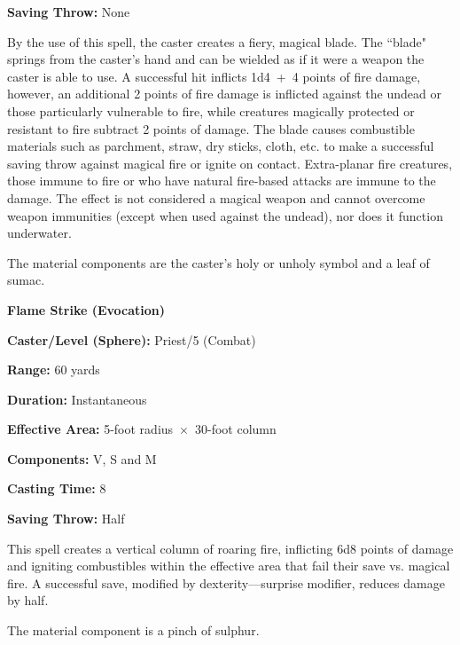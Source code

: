 \begin{multicols}{2}
\begin{minipage}{\columnwidth}
\noindent \textbf{Saving Throw:} None

\end{minipage}

By the use of this spell, the caster creates a fiery, magical blade.  The ``blade" springs from the caster's hand and can be wielded as if it were a weapon the caster is able to use.  A successful hit inflicts 1d4~+~4 points of fire damage, however, an additional 2 points of fire damage is inflicted against the undead or those particularly vulnerable to fire, while creatures magically protected or resistant to fire subtract 2 points of damage.  The blade causes combustible materials such as parchment, straw, dry sticks, cloth, etc. to make a successful saving throw against magical fire or ignite on contact.  Extra-planar fire creatures, those immune to fire or who have natural fire-based attacks are immune to the damage.  The effect is not considered a magical weapon and cannot overcome weapon immunities (except when used against the undead), nor does it function underwater.

The material components are the caster's holy or unholy symbol and a leaf of sumac.

\vspace{1em}

\noindent
\begin{minipage}{\columnwidth}

\noindent \textbf{Flame Strike (Evocation)}

\noindent \textbf{Caster/Level (Sphere):} Priest/5 (Combat)

\noindent \textbf{Range:} 60 yards

\noindent \textbf{Duration:} Instantaneous

\noindent \textbf{Effective Area:} 5-foot radius~$\times$~30-foot column

\noindent \textbf{Components:} V, S and M

\noindent \textbf{Casting Time:} 8

\noindent \textbf{Saving Throw:} Half

\end{minipage}

This spell creates a vertical column of roaring fire, inflicting 6d8 points of damage and igniting combustibles within the effective area that fail their save vs. magical fire.  A successful save, modified by dexterity---surprise modifier, reduces damage by half.

The material component is a pinch of sulphur.


\end{multicols}
